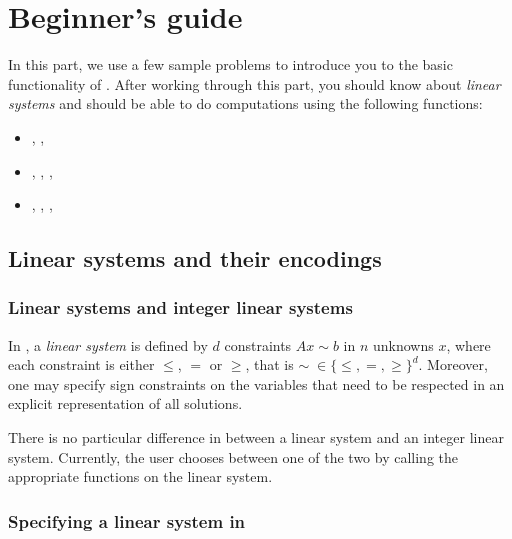 %
%
%

\chapter{Beginner's guide}

In this part, we use a few sample problems to introduce
you to the basic functionality of \FourTiTwo{}. After working
through this part, you should know about \emph{linear systems} and
should be able to do computations using the following functions:
\begin{itemize}
\item {}, , 
\item {}, , , 
\item {}, , , 
\end{itemize}



\section{Linear systems and their encodings}

\subsection{Linear systems and integer linear systems}

In \FourTiTwo, a \emph{linear system} is defined by $d$ constraints
$Ax\sim b$ in $n$ unknowns $x$, where each constraint is either
$\leq$, $=$ or $\geq$, that is $\sim\;\in\{\leq,=,\geq\}^d$.
Moreover, one may specify sign constraints on the variables that
need to be respected in an explicit representation of all solutions.

There is no particular difference in \FourTiTwo{} between a linear
system and an integer linear system. Currently, the user chooses
between one of the two by calling the appropriate functions on the
linear system.

\subsection{Specifying a linear system in \FourTiTwo}

